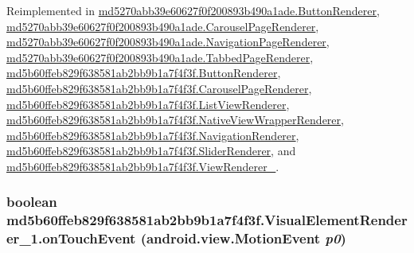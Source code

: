 Reimplemented in \hyperlink{classmd5270abb39e60627f0f200893b490a1ade_1_1_button_renderer_f2e3875cd2b7a03f7278f91e55939532}{md5270abb39e60627f0f200893b490a1ade.ButtonRenderer}, \hyperlink{classmd5270abb39e60627f0f200893b490a1ade_1_1_carousel_page_renderer_078976cb18c541b71fc96248ccd767e6}{md5270abb39e60627f0f200893b490a1ade.CarouselPageRenderer}, \hyperlink{classmd5270abb39e60627f0f200893b490a1ade_1_1_navigation_page_renderer_4a98b6254362130c58ffc36a0a18744a}{md5270abb39e60627f0f200893b490a1ade.NavigationPageRenderer}, \hyperlink{classmd5270abb39e60627f0f200893b490a1ade_1_1_tabbed_page_renderer_c4353b82562a8ecc7822860dd790a58f}{md5270abb39e60627f0f200893b490a1ade.TabbedPageRenderer}, \hyperlink{classmd5b60ffeb829f638581ab2bb9b1a7f4f3f_1_1_button_renderer_32dc12b457387df026545663655ce4b2}{md5b60ffeb829f638581ab2bb9b1a7f4f3f.ButtonRenderer}, \hyperlink{classmd5b60ffeb829f638581ab2bb9b1a7f4f3f_1_1_carousel_page_renderer_f11f357363dd9368b7df9be259fd7574}{md5b60ffeb829f638581ab2bb9b1a7f4f3f.CarouselPageRenderer}, \hyperlink{classmd5b60ffeb829f638581ab2bb9b1a7f4f3f_1_1_list_view_renderer_aab562eda2712d67615715b8aa3d00c7}{md5b60ffeb829f638581ab2bb9b1a7f4f3f.ListViewRenderer}, \hyperlink{classmd5b60ffeb829f638581ab2bb9b1a7f4f3f_1_1_native_view_wrapper_renderer_428463947529e7fd1d164b52f9d54d56}{md5b60ffeb829f638581ab2bb9b1a7f4f3f.NativeViewWrapperRenderer}, \hyperlink{classmd5b60ffeb829f638581ab2bb9b1a7f4f3f_1_1_navigation_renderer_7a117ff161f3a6f2d44642c32fba1306}{md5b60ffeb829f638581ab2bb9b1a7f4f3f.NavigationRenderer}, \hyperlink{classmd5b60ffeb829f638581ab2bb9b1a7f4f3f_1_1_slider_renderer_fac38e4eaa408c22962aa4a88025b986}{md5b60ffeb829f638581ab2bb9b1a7f4f3f.SliderRenderer}, and \hyperlink{classmd5b60ffeb829f638581ab2bb9b1a7f4f3f_1_1_view_renderer__2_0b758be41e41d3577cadf82bc8d004b6}{md5b60ffeb829f638581ab2bb9b1a7f4f3f.ViewRenderer\_}.\hypertarget{classmd5b60ffeb829f638581ab2bb9b1a7f4f3f_1_1_visual_element_renderer__1_3beb6d0ebf9e1eca68fed2eac13c88ac}{
\subsubsection[{onTouchEvent}]{\setlength{\rightskip}{0pt plus 5cm}boolean md5b60ffeb829f638581ab2bb9b1a7f4f3f.VisualElementRenderer\_\-1.onTouchEvent (android.view.MotionEvent {\em p0})}}
\label{classmd5b60ffeb829f638581ab2bb9b1a7f4f3f_1_1_visual_element_renderer__1_3beb6d0ebf9e1eca68fed2eac13c88ac}




